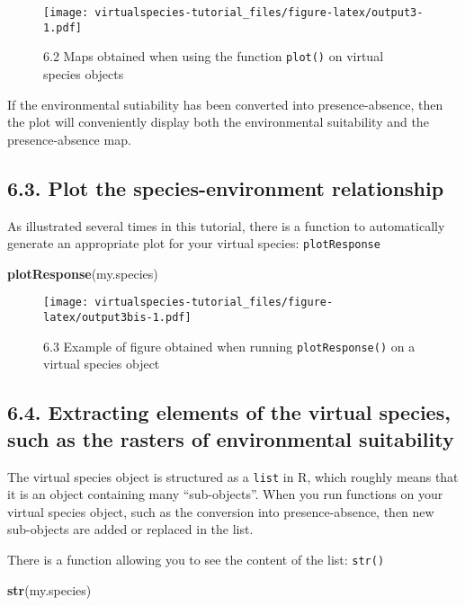 \documentclass[]{article}
\newenvironment{Shaded}{\begin{snugshade}}{\end{snugshade}}
\newcommand{\KeywordTok}[1]{\textcolor[rgb]{0.13,0.29,0.53}{\textbf{#1}}}
\newcommand{\NormalTok}[1]{#1}
\begin{document}
\begin{figure}
\centering
\texttt{[image: virtualspecies-tutorial\_files/figure-latex/output3-1.pdf]}
\caption{6.2 Maps obtained when using the function \texttt{plot()} on
virtual species objects}
\end{figure}

If the environmental sutiability has been converted into
presence-absence, then the plot will conveniently display both the
environmental suitability and the presence-absence map.

\subsection{6.3. Plot the species-environment
relationship}\label{plot-the-species-environment-relationship}

As illustrated several times in this tutorial, there is a function to
automatically generate an appropriate plot for your virtual species:
\texttt{plotResponse}

\begin{Shaded}
\begin{Highlighting}[]
\KeywordTok{plotResponse}\NormalTok{(my.species)}
\end{Highlighting}
\end{Shaded}

\begin{figure}
\centering
\texttt{[image: virtualspecies-tutorial\_files/figure-latex/output3bis-1.pdf]}
\caption{6.3 Example of figure obtained when running
\texttt{plotResponse()} on a virtual species object}
\end{figure}

\subsection{6.4. Extracting elements of the virtual species, such as the
rasters of environmental
suitability}\label{extracting-elements-of-the-virtual-species-such-as-the-rasters-of-environmental-suitability}

The virtual species object is structured as a \texttt{list} in R, which
roughly means that it is an object containing many ``sub-objects''. When
you run functions on your virtual species object, such as the conversion
into presence-absence, then new sub-objects are added or replaced in the
list.

There is a function allowing you to see the content of the list:
\texttt{str()}

\begin{Shaded}
\begin{Highlighting}[]
\KeywordTok{str}\NormalTok{(my.species)}
\end{Highlighting}
\end{Shaded}
\end{document}
